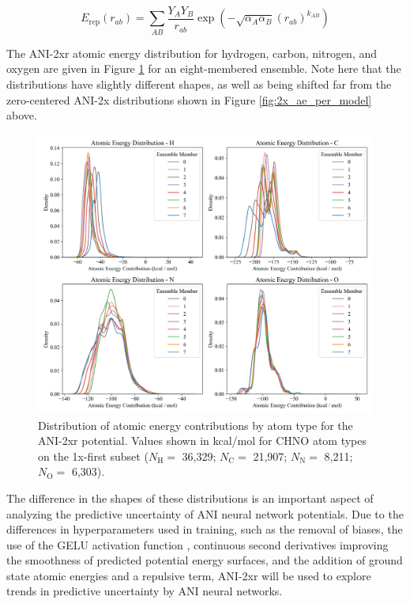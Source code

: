 \begin{equation}
\label{eq:repulsion}
    E_{\text{rep}}(r_{ab}) = 
    \sum_{AB}\frac{{Y_{A} Y_{B}}}{r_{ab}}
    \exp \left( -\sqrt{\alpha_{A} \alpha_{B}} {(r_{ab})}^{k_{AB}} \right)
\end{equation}

The ANI-2xr atomic energy distribution for hydrogen, carbon, nitrogen, and oxygen are given in Figure \ref{fig:2xr_ae_per_model} for an eight-membered ensemble.
Note here that the distributions have slightly different shapes, as well as being shifted far from the zero-centered ANI-2x distributions shown in Figure \ref{fig:2x_ae_per_model} above.

\begin{figure}[H]
    \centering
    \includegraphics[width=1\linewidth]{Images/2xr_outputs/2xr_1x-first_ae-per-model.png}
    \caption[Atomic energies predicted by ANI-2xr]{Distribution of atomic energy contributions by atom type for the ANI-2xr potential. Values shown in kcal/mol for CHNO atom types on the 1x-first subset  ($N_\text{H}=$ 36,329; 
    $N_\text{C}=$ 21,907; 
    $N_\text{N}=$ 8,211;
    $N_\text{O}=$ 6,303).}
    \label{fig:2xr_ae_per_model}
\end{figure}

The difference in the shapes of these distributions is an important aspect of analyzing the predictive uncertainty of ANI neural network potentials.
Due to the differences in hyperparameters used in training, such as the removal of biases, the use of the GELU activation function \cite{gelu}, continuous second derivatives improving the smoothness of predicted potential energy surfaces, and the addition of ground state atomic energies and a repulsive term, ANI-2xr will be used to explore trends in predictive uncertainty by ANI neural networks. 

